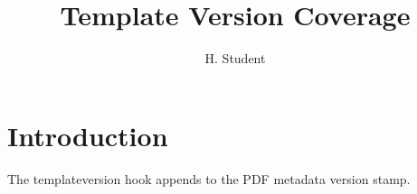 \documentclass[phd,12pt,a4paper]{bangorthesis}
\title{Template Version Coverage}
\author{H. Student}
\begin{document}
\makeatletter
{}
\makeatother
\maketitle
\chapter{Introduction}
The templateversion hook appends to the PDF metadata version stamp.
\end{document}
